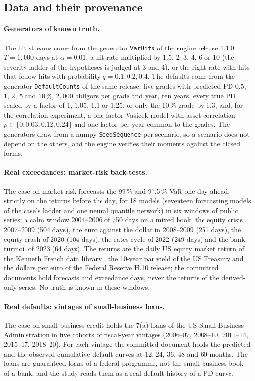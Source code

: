 \subsection{Data and their provenance}
\label{sec:design-data}

\paragraph{Generators of known truth.}
The hit streams come from the generator \texttt{VarHits} of the engine release 1.1.0: $T=1{,}000$ days at $\alpha=0.01$, a hit rate multiplied by 1.5, 2, 3, 4, 6 or 10 (the severity ladder of the hypotheses is judged at 3 and 4), or the right rate with hits that follow hits with probability $q=0.1,0.2,0.4$. The defaults come from the generator \texttt{DefaultCounts} of the same release:
five grades with predicted PD $0.5$, $1$, $2$, $5$ and $10\,\%$, $2{,}000$ obligors per grade and year, ten years, every true PD scaled by a factor of 1, 1.05, 1.1 or 1.25, or only the 10\,\% grade by 1.3, and, for the correlation experiment, a one-factor Vasicek model with asset correlation $\rho\in\{0,0.03,0.12,0.24\}$ and one factor per year common to the grades. The generators draw from a numpy
\texttt{SeedSequence} per scenario, so a scenario does not depend on the others, and the engine verifies their moments against the closed forms.

\paragraph{Real exceedances: market-risk back-tests.}
The case on market risk forecasts the 99\,\% and 97.5\,\% VaR one day ahead, strictly on the returns before the day, for 18 models (seventeen forecasting models of the case's ladder and one neural quantile network) in six windows of public series: a calm window 2004--2006 of 750 days on a mixed book, the equity crisis 2007--2009 (504 days),
the euro against the dollar in 2008--2009 (251 days), the equity crash of 2020 (104 days), the rates cycle of 2022 (249 days) and the bank turmoil of 2023 (64 days). The returns are the daily US equity market return of the Kenneth French data library \citep{french2025}, the 10-year par yield of the US Treasury and the dollars per euro of the Federal Reserve H.10 release; the committed documents hold forecasts and exceedance days, never the returns of the derived-only series.
No truth is known in these windows.

\paragraph{Real defaults: vintages of small-business loans.}
The case on small-business credit holds the 7(a) loans of the US Small Business Administration \citep{sba2026} in five cohorts of fiscal-year vintages (2006--07, 2008--10, 2011--14, 2015--17, 2018--20). For each vintage the committed document holds the predicted and the observed cumulative default curves at 12, 24, 36, 48 and 60 months. The
loans are guaranteed loans of a federal programme, not the small-business book of a bank, and the study reads them as a real default history of a PD curve.

